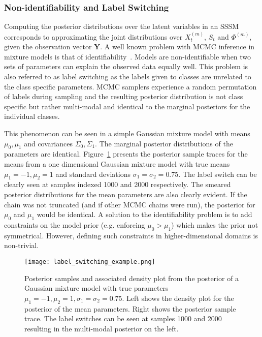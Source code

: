 \subsubsection{Non-identifiability and Label Switching}
Computing the posterior distributions over the latent variables in an SSSM corresponds to approximating the joint distributions over $X_t^{(m)}$, $S_t$ and $\Phi^{(m)}$, given the observation vector $\mathbf{Y}$. A well known problem with MCMC inference in mixture models is that of identifiability~\citep{jasra2005markov}. Models are non-identifiable when two sets of parameters can explain the observed data equally well. This problem is also referred to as label switching as the labels given to classes are unrelated to the class specific parameters. MCMC samplers experience a random permutation of labels during sampling and the resulting posterior distribution is not class specific but rather multi-modal and identical to the marginal posteriors for the individual classes.

This phenomenon can be seen in a simple Gaussian mixture model with means $\mu_0, \mu_1$ and covariances $\Sigma_0, \Sigma_1$. The marginal posterior distributions of the parameters are identical. Figure~\ref{fig:label_switching_example} presents the posterior sample traces for the means from a one dimensional Gaussian mixture model with true means $\mu_1 = -1, \mu_2=1$ and standard deviations $\sigma_1=\sigma_2=0.75$. The label switch can be clearly seen at samples indexed 1000 and 2000 respectively. The smeared posterior distributions for the mean parameters are also clearly evident. If the chain was not truncated (and if other MCMC chains were run), the posterior for $\mu_0$ and $\mu_1$ would be identical. A solution to the identifiability problem is to add constraints on the model prior (e.g. enforcing $\mu_0 > \mu_1$) which makes the prior not symmetrical. However, defining such constraints in higher-dimensional domains is non-trivial.

\begin{figure}
  \centering
  \texttt{[image: label\_switching\_example.png]}
  \caption{Posterior samples and associated density plot from the posterior of a Gaussian mixture model with true parameters $\mu_1 = -1, \mu_2=1, \sigma_1=\sigma_2=0.75$. Left shows the density plot for the posterior of the mean parameters. Right shows the posterior sample trace. The label switches can be seen at samples 1000 and 2000 resulting in the multi-modal posterior on the left.}
  \label{fig:label_switching_example}
\end{figure}

